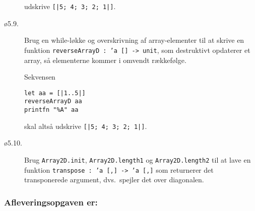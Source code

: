 \documentclass[a4paper]{article}
\begin{document}
\begin{description}
udskrive \texttt{[|5; 4; 3; 2; 1|]}.

\item[ø5.9.] Brug en while-løkke og overskrivning af array-elementer
  til at skrive en funktion \texttt{reverseArrayD : 'a [] -> unit}, som
  destruktivt opdaterer et array, så elementerne kommer i omvendt
  rækkefølge.

  Sekvensen

\begin{verbatim}
let aa = [|1..5|]
reverseArrayD aa
printfn "%A" aa
\end{verbatim}

skal altså udskrive \texttt{[|5; 4; 3; 2; 1|]}.

\item[ø5.10.] Brug \texttt{Array2D.init}, \texttt{Array2D.length1} og
  \texttt{Array2D.length2} til at lave en funktion \texttt{transpose :
    'a [,] -> 'a [,]} som returnerer det transponerede argument,
  dvs.\ spejler det over diagonalen.

\end{description}

\subsubsection*{Afleveringsopgaven er:}
\end{document}
